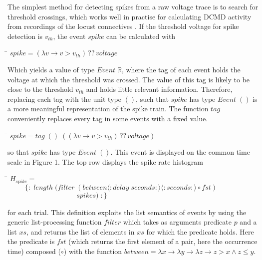 \documentclass[11pt]{article}
\newlength{\lwidth}\setlength{\lwidth}{4.5cm}
\newlength{\cwidth}\setlength{\cwidth}{8mm} %
\newcommand{\Conid}[1]{\mathit{#1}}
\newcommand{\Varid}[1]{\mathit{#1}}
\renewcommand{\leq}{\leqslant}
\begin{document}
The simplest method for detecting spikes from a raw voltage trace is
to search for threshold crossings, which works well in practise for
calculating DCMD activity from recordings of the locust connectives
\cite{Gabbiani2001}. If the threshold voltage for spike detection is
\ensuremath{v_{th}}, the event \ensuremath{\Varid{spike}} can be calculated with
\begin{tabbing}
\qquad\=\hspace{\lwidth}\=\hspace{\cwidth}\=\+\kill
${\Varid{spike}\mathrel{=}(\lambda \Varid{v}\to \Varid{v}\mathbin{>}v_{th})\,??\,\Varid{voltage}}$
\end{tabbing}Which yields a value of type \ensuremath{\Conid{Event}\;\mathbb{R}}, where the tag of each event
holds the voltage at which the threshold was crossed. The value of
this tag is likely to be close to the threshold \ensuremath{v_{th}} and holds little
relevant information. Therefore, replacing each tag with the unit type
\ensuremath{()}, such that \ensuremath{\Varid{spike}} has type \ensuremath{\Conid{Event}\;()} is a more meaningful
representation of the spike train. The function \ensuremath{\Varid{tag}} conveniently
replaces every tag in some events with a fixed value.
\begin{tabbing}
\qquad\=\hspace{\lwidth}\=\hspace{\cwidth}\=\+\kill
${\Varid{spike}\mathrel{=}\Varid{tag}\;()\;((\lambda \Varid{v}\to \Varid{v}\mathbin{>}v_{th})\,??\,\Varid{voltage})}$
\end{tabbing}so that \ensuremath{\Varid{spike}} has type \ensuremath{\Conid{Event}\;()}. This event is displayed on the
common time scale in Figure 1. The top row displays the spike rate
histogram
\begin{tabbing}
\qquad\=\hspace{\lwidth}\=\hspace{\cwidth}\=\+\kill
${H_{spike}\mathrel{=}}$\\
${\phantom{H_{spike}\mbox{}}\{\!:\!\;\Varid{length}\;(\Varid{filter}\;(\Varid{between}\langle:\Varid{delay}\;\Varid{seconds}:\rangle\langle:\Varid{seconds}:\rangle\mathbin{\circ}\Varid{fst})\;}$\\
${\phantom{H_{spike}\mbox{}}\phantom{\{\!:\!\;\Varid{length}\;(\Varid{filter}\;\mbox{}}\Varid{spikes})\;\!:\!\}}$
\end{tabbing}for each trial. This definition exploits the list semantics of events
by using the generic list-processing function \ensuremath{\Varid{filter}} which takes as
arguments predicate \ensuremath{\Varid{p}} and a list \ensuremath{\Varid{xs}}, and returns the list of
elements in \ensuremath{\Varid{xs}} for which the predicate holds. Here the predicate is
\ensuremath{\Varid{fst}} (which returns the first element of a pair, here the occurrence
time) composed (\ensuremath{\mathbin{\circ}}) with the function \ensuremath{\Varid{between}\mathrel{=}\lambda \Varid{x}\to \lambda \Varid{y}\to \lambda \Varid{z}\to \Varid{z}\mathbin{>}\Varid{x}\mathrel{\wedge}\Varid{z}\leq \Varid{y}}. 
\end{document}
